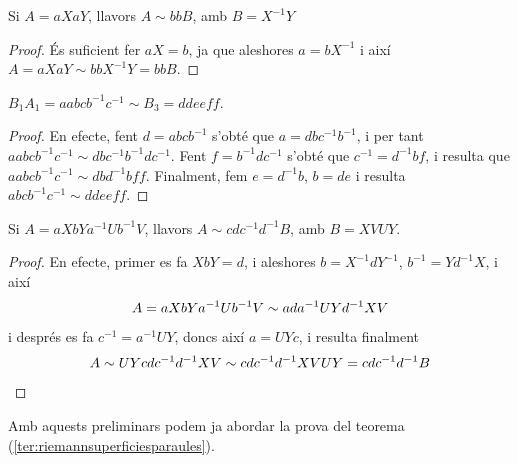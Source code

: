 \documentclass[../main.tex]{subfiles}
\begin{document}
\begin{lema}
\label{lema:creaciodeplansprojectius} Si $A = aXaY$, llavors $A\sim bbB$, amb $B=X^{-1}Y$
\end{lema}
\begin{proof}
És suficient fer $aX=b$, ja que aleshores $a=bX^{-1}$ i així $A=aXaY\sim bbX^{-1}Y = bbB$.
\end{proof}

\begin{lema}\label{lema:lema3}
$B_1A_1=aabcb^{-1}c^{-1}\sim B_3=ddeeff$.
\end{lema}
\begin{proof}
En efecte, fent $d = abcb^{-1}$ s'obté que $a = dbc^{-1}b^{-1}$, i per tant $aabcb^{-1}c^{-1}\sim dbc^{-1}b^{-1}dc^{-1}$. Fent $f = b^{-1}dc^{-1}$ s'obté que $c^{-1}=d^{-1}bf$, i resulta que $aabcb^{-1}c^{-1}\sim dbd^{-1}bff$. Finalment, fem $e = d^{-1}b$, $b=de$ i resulta $abcb^{-1}c^{-1}\sim ddeeff$.
\end{proof}

\begin{lema}
\label{lema:creaciodetorus} Si $A = aXbYa^{-1}Ub^{-1}V$, llavors $A\sim cdc^{-1}d^{-1}B$, amb $B=XVUY$.
\end{lema}
\begin{proof}
En efecte, primer es fa $XbY=d$, i aleshores $b= X^{-1}dY^{-1}$, $b^{-1}=Yd^{-1}X$, i així
\begin{equation}
    \notag
    A=aXbYa^{-1}Ub^{-1}V\sim ada^{-1}UYd^{-1}XV
\end{equation}
i després es fa $c^{-1}=a^{-1}UY$, doncs així $a = UYc$, i resulta finalment
\begin{equation}
    \notag
    A\sim UYcdc^{-1}d^{-1}XV\sim cdc^{-1}d^{-1}XVUY=cdc^{-1}d^{-1}B
\end{equation}
\end{proof}

Amb aquests preliminars podem ja abordar la prova del teorema (\ref{ter:riemannsuperficiesparaules}).
\end{document}

